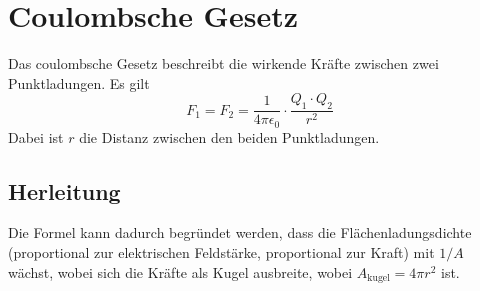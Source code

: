 \documentclass{article}
\begin{document}
\section{Coulombsche Gesetz} 
Das coulombsche Gesetz beschreibt die wirkende Kräfte zwischen zwei Punktladungen.
Es gilt
\[
 F_1 = F_2 = \frac{1}{4 \pi \epsilon_0} \cdot \frac{Q_1 \cdot Q_2}{r^2}
\]
Dabei ist $r$ die Distanz zwischen den beiden Punktladungen.
\subsection{Herleitung}
Die Formel kann dadurch begründet werden, dass die Flächenladungsdichte (proportional zur elektrischen Feldstärke, proportional zur Kraft) mit $1 / A$ wächst, wobei sich die Kräfte als Kugel ausbreite, wobei $A_{\text{kugel}} = 4 \pi r^2$ ist.
 
\end{document}
